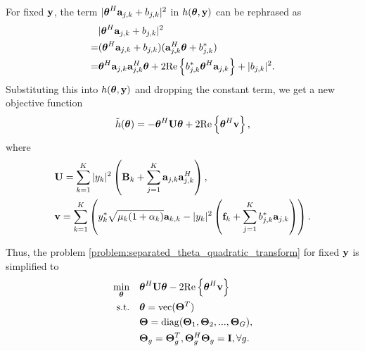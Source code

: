 For fixed $\bf{y}$, the term $|\boldsymbol{\theta}^H {\bf a}_{j,k} + b_{j,k}|^2$ in $h(\boldsymbol{\theta}, {\bf y})$
 can be rephrased as
\begin{align}
    &|\boldsymbol{\theta}^H {\bf a}_{j,k} + b_{j,k}|^2 \nonumber\\
    = &(\boldsymbol{\theta}^H {\bf a}_{j,k} + b_{j,k}) ( {\bf a}_{j,k}^H\boldsymbol{\theta} + b_{j,k}^*) \nonumber \\
    = &\boldsymbol{\theta}^H {\bf a}_{j,k} {\bf a}_{j,k}^H \boldsymbol{\theta} + 2 \mathrm{Re} \left\{ b_{j,k}^* \boldsymbol{\theta}^H {\bf a}_{j,k}  \right\} + |b_{j,k}|^2 .
\end{align}
Substituting this into $h(\boldsymbol{\theta}, {\bf y})$ and dropping the constant term, we get a new objective function
\begin{equation}
    \tilde{h}(\boldsymbol{\theta}) = -\boldsymbol{\theta}^H {\bf U} \boldsymbol{\theta} + 2 \mathrm{Re} \left\{ \boldsymbol{\theta}^H {\bf v} \right\},
\end{equation}
where 
\begin{align}
    &{\bf U} = \sum_{k=1}^K |y_k|^2 \left({\bf B}_k + \sum_{j=1}^K {\bf a}_{j,k} {\bf a}_{j,k}^H  \right), \\
    &{\bf v} = \sum_{k=1}^K \left( y_k^* \sqrt{\mu_k(1+\alpha_k)} {\bf a}_{k,k} - |y_k|^2 \left( {\bf f}_k + \sum_{j=1}^K b_{j,k}^* {\bf a}_{j,k} \right) \right).
\end{align}

Thus, the problem \eqref{problem:separated_theta_quadratic_transform} for fixed ${\bf y}$ is simplified to
\begin{subequations} \label{problem:separated_theta_quadratic_form}
    \begin{align}
        \min_{\boldsymbol{\theta}} \quad & \boldsymbol{\theta}^H {\bf U} \boldsymbol{\theta} - 2 \mathrm{Re} \left\{ \boldsymbol{\theta}^H {\bf v} \right\}\\  
        \mathrm{s.t.} \quad &  \boldsymbol{\theta} = \mathrm{vec}({\bf \Theta}^T)
        \\ &{\bf \Theta} = \mathrm{diag}({\bf \Theta}_1,{\bf \Theta}_2,...,{\bf \Theta}_G), 
        \\ &{\bf \Theta}_g = {\bf \Theta}_g^T, {\bf \Theta}_g^H{\bf \Theta}_g = {\bf I}, \forall g.
    \end{align}
\end{subequations}

